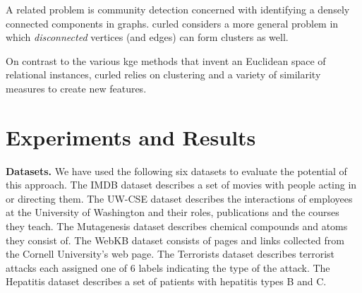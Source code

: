 A related problem is community detection \cite{Karypis:1998:FHQ:305219.305248,Fortunato201075} concerned with identifying a densely connected components in graphs.
\gls{curled} considers a more general problem in which \textit{disconnected} vertices (and edges) can form clusters as well.


On contrast to the various \gls{kge} methods that invent an Euclidean space of relational instances, \gls{curled} relies on clustering and a variety of similarity measures to create new features.


\section{Experiments and Results}
\label{sec:Results}




\textbf{Datasets.}
We have used the following six datasets to evaluate the potential of this approach.
The IMDB dataset describes a set of movies with people acting in or directing them.
The UW-CSE dataset describes the interactions of employees at the University of Washington and their roles, publications and the courses they teach.
The Mutagenesis dataset describes chemical compounds and atoms they consist of.
The WebKB dataset consists of pages and links collected from the Cornell University's web page.
The Terrorists dataset describes terrorist attacks each assigned one of 6 labels indicating the type of the attack.
The Hepatitis dataset describes a set of patients with hepatitis types B and C.



